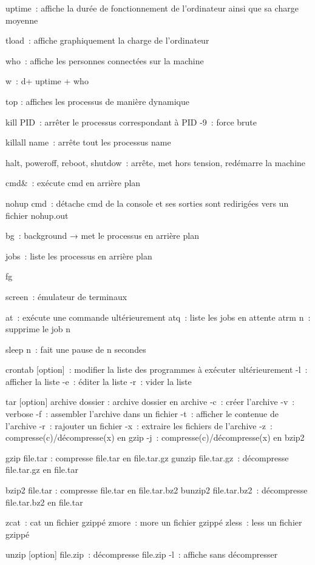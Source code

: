 \documentclass[a4paper, 10pt, onecolumn, openright, oneside]{book}
\begin{document}
{{uptime : affiche la durée de fonctionnement de l’ordinateur ainsi que sa charge moyenne

tload : affiche graphiquement la charge de l’ordinateur

who : affiche les personnes connectées sur la machine

w : d\te + uptime + who

top : affiches les processus de manière dynamique

kill PID : arrêter le processus correspondant à PID
-9 : force brute

killall name : arrête tout les processus name

halt, poweroff, reboot, shutdow : arrête, met hors tension, redémarre la machine

cmd& : exécute cmd en arrière plan

nohup cmd : détache cmd de la console et ses sorties sont redirigées vers un fichier nohup.out

bg : background → met le processus en arrière plan

jobs : liste les processus en arrière plan

fg %

screen : émulateur de terminaux

at : exécute une commande ultérieurement
atq : liste les jobs en attente
atrm n : supprime le job n

sleep n : fait une pause de n secondes

crontab [option] : modifier la liste des programmes à exécuter ultérieurement
-l : afficher la liste
-e : éditer la liste
-r : vider la liste

tar [option] archive dossier : archive dossier en archive
-c : créer l’archive
-v : verbose
-f : assembler l’archive dans un fichier
-t : afficher le contenue de l’archive 
-r : rajouter un fichier
-x : extraire les fichiers de l’archive
-z : compresse(c)/décompresse(x) en gzip
-j : compresse(c)/décompresse(x) en bzip2

gzip file.tar : compresse file.tar en file.tar.gz
gunzip file.tar.gz : décompresse file.tar.gz en file.tar

bzip2 file.tar : compresse file.tar en file.tar.bz2
bunzip2 file.tar.bz2 : décompresse file.tar.bz2 en file.tar

zcat : cat un fichier gzippé
zmore : more un fichier gzippé
zless : less un fichier gzippé 

unzip [option] file.zip : décompresse file.zip
-l : affiche sans décompresser

}}
\end{document}
